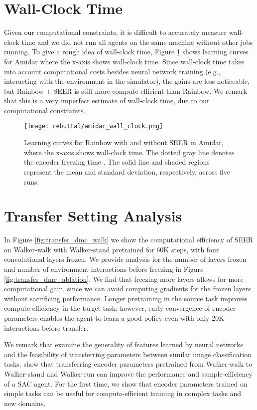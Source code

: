 \documentclass{article}
\begin{document}
\section{Wall-Clock Time} \label{appendix:wall_clock_time}

Given our computational constraints, it is difficult to accurately measure wall-clock time and we did not run all agents on the same machine without other jobs running. To give a rough idea of wall-clock time, Figure \ref{fig:wall_clock} shows learning curves for Amidar where the x-axis shows wall-clock time. Since wall-clock time takes into account computational costs besides neural network training (e.g., interacting with the environment in the simulator), the gains are less noticeable, but Rainbow + SEER is still more compute-efficient than Rainbow. We remark that this is a very imperfect estimate of wall-clock time, due to our computational constraints.

\begin{figure} [t] \centering
\texttt{[image: rebuttal/amidar\_wall\_clock.png]}
\caption{Learning curves for Rainbow with and without SEER in Amidar, where the x-axis shows wall-clock time. The dotted gray line denotes the encoder freezing time . The solid line and shaded regions represent the mean and standard deviation, respectively, across five runs.} \label{fig:wall_clock}
\end{figure}


\section{Transfer Setting Analysis} \label{appendix:additional_transfer_dmc}
In Figure \ref{fig:transfer_dmc_walk} we show the computational efficiency of SEER on Walker-walk with Walker-stand pretrained for 60K steps, with four convolutional layers frozen. We provide analysis for the number of layers frozen and number of environment interactions before freezing  in Figure \ref{fig:transfer_dmc_ablation}. We find that freezing more layers allows for more computational gain, since we can avoid computing gradients for the frozen layers without sacrificing performance. Longer pretraining in the source task improves compute-efficiency in the target task; however, early convergence of encoder parameters enables the agent to learn a good policy even with only 20K interactions before transfer.

We remark that \citet{yosinski2014transferable} examine the generality of features learned by neural networks and the feasibility of transferring parameters between similar image classification tasks. \citet{yarats2019improving} show that transferring encoder parameters pretrained from Walker-walk to Walker-stand and Walker-run can improve the performance and sample-efficiency of a SAC agent. For the first time, we show that encoder parameters trained on simple tasks can be useful for compute-efficient training in complex tasks and new domains. 
\end{document}
